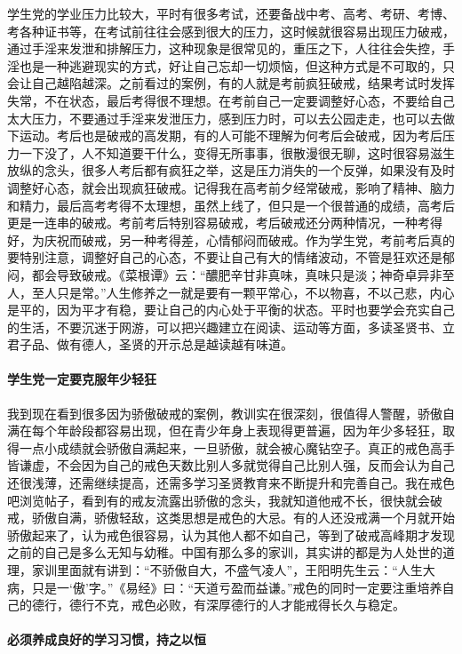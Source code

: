 学生党的学业压力比较大，平时有很多考试，还要备战中考、高考、考研、考博、考各种证书等，在考试前往往会感到很大的压力，这时候就很容易出现压力破戒，通过手淫来发泄和排解压力，这种现象是很常见的，重压之下，人往往会失控，手淫也是一种逃避现实的方式，好让自己忘却一切烦恼，但这种方式是不可取的，只会让自己越陷越深。之前看过的案例，有的人就是考前疯狂破戒，结果考试时发挥失常，不在状态，最后考得很不理想。在考前自己一定要调整好心态，不要给自己太大压力，不要通过手淫来发泄压力，感到压力时，可以去公园走走，也可以去做下运动。考后也是破戒的高发期，有的人可能不理解为何考后会破戒，因为考后压力一下没了，人不知道要干什么，变得无所事事，很散漫很无聊，这时很容易滋生放纵的念头，很多人考后都有疯狂之举，这是压力消失的一个反弹，如果没有及时调整好心态，就会出现疯狂破戒。记得我在高考前夕经常破戒，影响了精神、脑力和精力，最后高考考得不太理想，虽然上线了，但只是一个很普通的成绩，高考后更是一连串的破戒。考前考后特别容易破戒，考后破戒还分两种情况，一种考得好，为庆祝而破戒，另一种考得差，心情郁闷而破戒。作为学生党，考前考后真的要特别注意，调整好自己的心态，不要让自己有大的情绪波动，不管是狂欢还是郁闷，都会导致破戒。《菜根谭》云：“醲肥辛甘非真味，真味只是淡；神奇卓异非至人，至人只是常。”人生修养之一就是要有一颗平常心，不以物喜，不以己悲，内心是平的，因为平才有稳，要让自己的内心处于平衡的状态。平时也要学会充实自己的生活，不要沉迷于网游，可以把兴趣建立在阅读、运动等方面，多读圣贤书、立君子品、做有德人，圣贤的开示总是越读越有味道。

\paragraph{学生党一定要克服年少轻狂}

我到现在看到很多因为骄傲破戒的案例，教训实在很深刻，很值得人警醒，骄傲自满在每个年龄段都容易出现，但在青少年身上表现得更普遍，因为年少多轻狂，取得一点小成绩就会骄傲自满起来，一旦骄傲，就会被心魔钻空子。真正的戒色高手皆谦虚，不会因为自己的戒色天数比别人多就觉得自己比别人强，反而会认为自己还很浅薄，还需继续提高，还需多学习圣贤教育来不断提升和完善自己。我在戒色吧浏览帖子，看到有的戒友流露出骄傲的念头，我就知道他戒不长，很快就会破戒，骄傲自满，骄傲轻敌，这类思想是戒色的大忌。有的人还没戒满一个月就开始骄傲起来了，认为戒色很容易，认为其他人都不如自己，等到了破戒高峰期才发现之前的自己是多么无知与幼稚。中国有那么多的家训，其实讲的都是为人处世的道理，家训里面就有讲到：“不骄傲自大，不盛气凌人”，王阳明先生云：“人生大病，只是一‘傲’字。”《易经》曰：“天道亏盈而益谦。”戒色的同时一定要注重培养自己的德行，德行不克，戒色必败，有深厚德行的人才能戒得长久与稳定。

\paragraph{必须养成良好的学习习惯，持之以恒}

